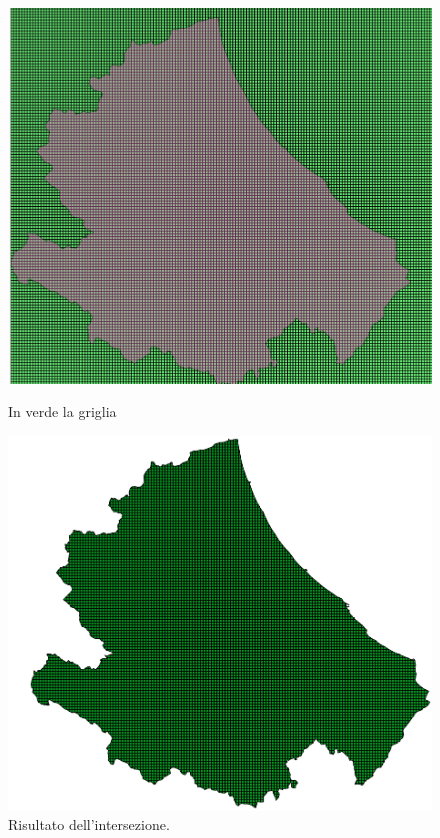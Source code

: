 \begin{figure}[h]
	\hspace{0.05\linewidth}
	\begin{minipage}[t]{0.40\linewidth}
		\centering
		\includegraphics[width=\textwidth]{images/abruzzoQuadratini.PNG}
		\caption{In verde la griglia }
		\label{fig:griglia}
	\end{minipage}
	\hspace{0.1\linewidth}
	\begin{minipage}[t]{0.40\linewidth}
		\centering
		\includegraphics[width=\textwidth]{images/abruzzo.PNG}
		\caption{Risultato dell'intersezione.}
		\label{fig:abruzzoGriglia}
	\end{minipage}
\end{figure}

